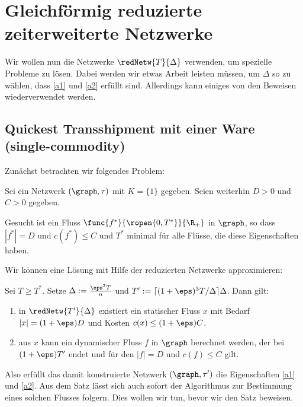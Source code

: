 \section{Gleichförmig reduzierte zeiterweiterte Netzwerke}\label{sec:unif_cond}
Wir wollen nun die Netzwerke $\redNetw{T}{\Delta}$ verwenden, um spezielle
Probleme zu lösen. Dabei werden wir etwas Arbeit leisten müssen, um
$\Delta$ so zu wählen, dass \ref{a1} und \ref{a2} erfüllt sind.
Allerdings kann einiges von den Beweisen wiederverwendet werden.

\subsection{Quickest Transshipment mit einer Ware (single-commodity)}
Zunächst betrachten wir folgendes Problem:

\begin{problem}
\label{prob:qtp_single}
    Sei ein Netzwerk $(\graph, \tau)$ mit $K=\{1\}$ gegeben.
    Seien weiterhin $D > 0$ und $C > 0$ gegeben.
    
    Gesucht ist ein Fluss $\func{f^*}{\ropen{0,T^*}}{\R_+}$ in $\graph$,
    so dass $|f^*| = D$ und $c(f^*) \leq C$ und $T^*$ minimal für alle Flüsse,
    die diese Eigenschaften haben.
\end{problem}

Wir können eine Lösung mit Hilfe der reduzierten Netzwerke approximieren:

\begin{theorem}\label{theo:qtp_flow_ex}
    Sei $T \geq T^*$. Setze $\Delta := \frac{\eps^2 T}{n}$ und
    $T' := \lceil (1+\eps)^3 T / \Delta \rceil \Delta$.
    Dann gilt:
    \begin{enumerate}[label={\alph*)}]
        \item in $\redNetw{T'}{\Delta}$ existiert ein statischer Fluss $x$ mit
            Bedarf $|x| = (1 + \eps)D$ und Kosten $c(x) \leq (1+\eps)C$.
        \item aus $x$ kann ein dynamischer Fluss $f$ in $\graph$ berechnet werden,
            der bei $(1+\eps)T'$ endet und für den $|f| = D$ und $c(f) \leq C$
            gilt.
    \end{enumerate}
\end{theorem}

Also erfüllt das damit konstruierte Netzwerk $(\graph, \tau')$ die Eigenschaften
\ref{a1} und \ref{a2}. Aus dem Satz lässt sich auch sofort der Algorithmus
zur Bestimmung eines solchen Flusses folgern. Dies wollen wir tun,
bevor wir den Satz beweisen.

